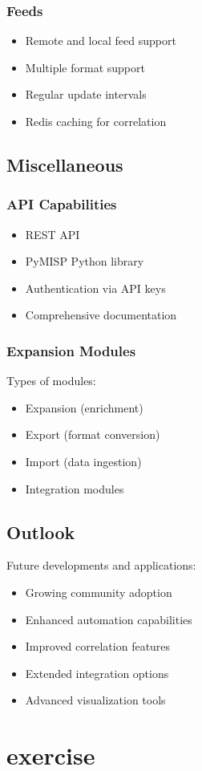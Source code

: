 \subsubsection{Feeds}
\begin{itemize}
    \item Remote and local feed support
    \item Multiple format support
    \item Regular update intervals
    \item Redis caching for correlation
\end{itemize}

\subsection{Miscellaneous}

\subsubsection{API Capabilities}
\begin{itemize}
    \item REST API
    \item PyMISP Python library
    \item Authentication via API keys
    \item Comprehensive documentation
\end{itemize}

\subsubsection{Expansion Modules}
Types of modules:
\begin{itemize}
    \item Expansion (enrichment)
    \item Export (format conversion)
    \item Import (data ingestion)
    \item Integration modules
\end{itemize}

\subsection{Outlook}
Future developments and applications:
\begin{itemize}
    \item Growing community adoption
    \item Enhanced automation capabilities
    \item Improved correlation features
    \item Extended integration options
    \item Advanced visualization tools
\end{itemize}


\section{exercise}
